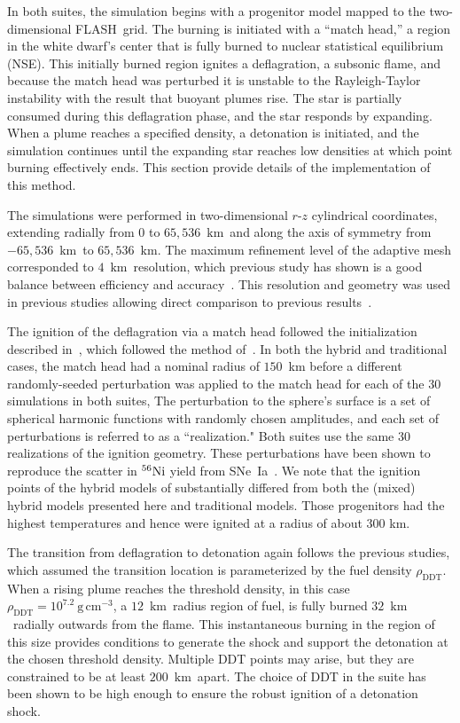 \documentclass[preprint2]{aastex63}
\newcommand{\SNeIa}{SNe~Ia}
\newcommand{\Ni}[1]{\ensuremath{{}^{#1}{\rm Ni}}}
\newcommand{\code}[1]{\textsc{#1}}
\newcommand{\FLASH}{\code{FLASH}}
\newcommand{\unitspace}{\ensuremath{\,}}
\newcommand{\usp}{\unitspace}
\newcommand{\unitstyle}[1]{\ensuremath{\mathrm{#1}}}
\newcommand{\power}[2]{\ensuremath{{#1}^{#2}}}
\newcommand{\centi}{\unitstyle{c}}
\newcommand{\kilo}{\unitstyle{k}}
\newcommand{\meter}{\unitstyle{m}}
\newcommand{\cm}{\centi\meter}
\newcommand{\gram}{\unitstyle{g}}
\newcommand{\grampercc}{\gram\usp\power{\cm}{-3}} %
\newcommand{\km}{\kilo\meter}   %
\begin{document}
In both suites, the simulation
begins with a progenitor model mapped to the two-dimensional
\FLASH\ grid. The burning is initiated with a ``match head,'' a region
in the white dwarf's center that is fully burned to nuclear statistical
equilibrium (NSE).
This initially burned region ignites a deflagration, a subsonic
flame, and because the match head was perturbed it is unstable to
the Rayleigh-Taylor instability with the result that buoyant plumes
rise. The star is partially consumed during this deflagration phase,
and the star responds by expanding.
When a plume reaches a specified density,
a detonation is initiated, and the simulation continues until
the expanding star reaches low densities at which point burning
effectively ends. This section provide details
of the implementation of this method.

The simulations were performed in two-dimensional $r$-$z$
cylindrical coordinates, extending radially from 0 to
$65,536$~\km\ and along the axis of symmetry from $-65,536$~\km\ to
$65,536$~\km. The maximum refinement level of the adaptive mesh
corresponded to $4$~\km\ resolution, which previous study has shown
is a good balance between efficiency and
accuracy~\citep{townsley.calder.ea:flame,townetal2009}.
This resolution and geometry was used in previous studies
allowing direct comparison to previous results~\citep{Kruegeretal2012}.

The ignition of the deflagration via a match head followed the
initialization described in~\citet{Kruegeretal2012}, which
followed the method of~\citet{townetal2009}.
In both the hybrid and traditional cases, the match head had a
nominal radius of $150$~km before
a different randomly-seeded perturbation was applied to the
match head for each of the 30 simulations in both suites,
The perturbation to the sphere's surface is a set of
spherical harmonic functions with randomly chosen amplitudes, and
each set of perturbations is referred to as a ``realization."
Both suites use the same 30 realizations of the ignition geometry.
These perturbations have been shown to reproduce
the scatter in \Ni{56}
yield from \SNeIa\ \citep{townetal2009}.
{\color{blue} We note that the ignition points of the hybrid models of 
\citet{willcoxetal2016} substantially differed from both the
(mixed) hybrid models presented here and  traditional models. Those progenitors
had the highest temperatures and hence were ignited at a radius of
about 300 km.} 


The transition from deflagration to detonation again follows
the previous studies, which assumed the transition location
is parameterized by the fuel density $\rho_{\mathrm{DDT}}$.
When a rising plume reaches the threshold density, in this case $\rho_{\mathrm{DDT}} = 10^{7.2}~\grampercc$, a $12$~\km\ radius region of fuel, is fully burned $32$~\km\ radially outwards from the flame.
This
instantaneous burning in the region of this size provides conditions
to generate the shock and support the detonation at the chosen
threshold density.  Multiple DDT points may arise, but they are
constrained to be at least $200$~\km\ apart. The choice of DDT
in the suite has been shown to be high enough to ensure
the robust ignition of a detonation shock.
\end{document}
